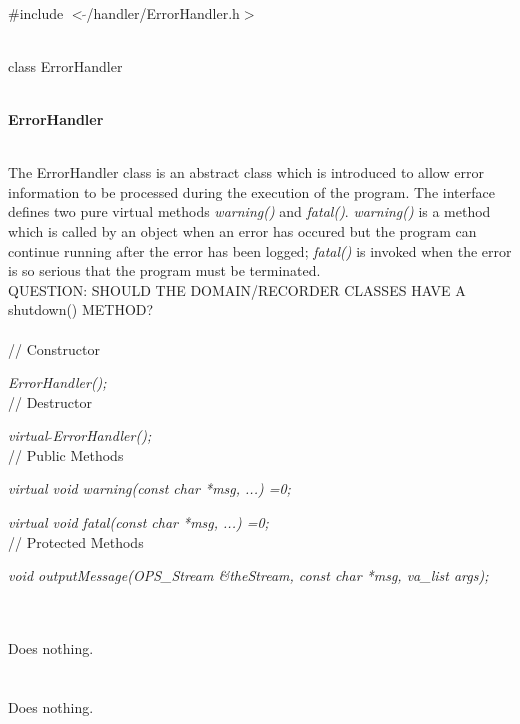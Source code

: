 
   \\
\#include $<\tilde{ }$/handler/ErrorHandler.h$>$  


  \\
class ErrorHandler 


 \\
{\bf ErrorHandler} 


  \\
\indent The ErrorHandler class is an abstract class which is
introduced to allow error information to be processed during the
execution of the program. The interface defines two pure virtual
methods {\em warning()} and {\em fatal()}. {\em warning()} is a method
which is called by an object when an error has occured but the program
can continue running after the error has been logged; {\em fatal()} is
invoked when the error is so serious that the program must be
terminated. \\ 

QUESTION: SHOULD THE DOMAIN/RECORDER CLASSES HAVE A shutdown() METHOD? \\

 \\
// Constructor 

{\em ErrorHandler();}\\ 

// Destructor 

{\em virtual $\tilde{ }$ErrorHandler();}\\ 

// Public Methods  

{\em virtual void warning(const char *msg, ...) =0;}

{\em virtual void fatal(const char *msg, ...) =0;}\\ 

// Protected Methods  

{\em void outputMessage(OPS_Stream \&theStream, const char *msg, va\_list args);} 


  \\
  \\ 
Does nothing.\\

 \\
\\ 
Does nothing. \\

